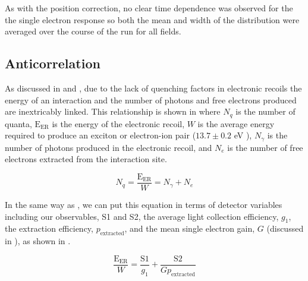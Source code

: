 As with the position correction, no clear time dependence was observed for the the single electron response so both the mean and width of the distribution were averaged over the course of the run for all fields.



\subsection{Anticorrelation}
\label{sec:nerix_anticorrelation}

As discussed in  and , due to the lack of quenching factors in electronic recoils the energy of an interaction and the number of photons and free electrons produced are inextricably linked.  This relationship is shown in  where $N_q$ is the number of quanta, $\textrm{E}_{\textrm{ER}}$ is the energy of the electronic recoil, $W$ is the average energy required to produce an exciton or electron-ion pair ($13.7 \pm 0.2$ eV \cite{dahl_thesis}), $N_{\gamma}$ is the number of photons produced in the electronic recoil, and $N_e$ is the number of free electrons extracted from the interaction site.

\begin{equation}
        \label{eqn:nerix_anticorrelation}
        N_q = \frac{\textrm{E}_{\textrm{ER}}}{W} = N_{\gamma} + N_{e}
\end{equation} 

In the same way as , we can put this equation in terms of detector variables including our observables, S1 and S2, the average light collection efficiency, $g_1$, the extraction efficiency, $p_{\textrm{extracted}}$, and the mean single electron gain, $G$ (discussed in ), as shown in .

\begin{equation}
        \label{eqn:nerix_anticorrelation_s1_s2}
        \frac{\textrm{E}_{\textrm{ER}}}{W} = \frac{\textrm{S1}}{g_1} + \frac{\textrm{S2}}{G p_{\textrm{extracted}}}
\end{equation}

